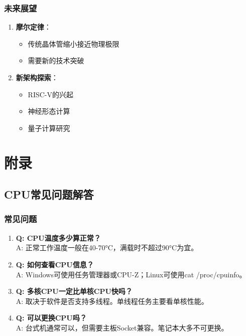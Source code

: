 \documentclass[12pt,UTF8]{ctexbook}
\begin{document}
\section{未来展望}

\begin{enumerate}
    \item \textbf{摩尔定律}：
    \begin{itemize}[leftmargin=2em]
        \item 传统晶体管缩小接近物理极限
        \item 需要新的技术突破
    \end{itemize}
    
    \item \textbf{新架构探索}：
    \begin{itemize}[leftmargin=2em]
        \item RISC-V的兴起
        \item 神经形态计算
        \item 量子计算研究
    \end{itemize}
\end{enumerate}

\part{附录}

\chapter{CPU常见问题解答}

\section{常见问题}

\begin{enumerate}
    \item \textbf{Q: CPU温度多少算正常？}
    \\A: 正常工作温度一般在40-70°C，满载时不超过90°C为宜。
    
    \item \textbf{Q: 如何查看CPU信息？}
    \\A: Windows可使用任务管理器或CPU-Z；Linux可使用cat /proc/cpuinfo。
    
    \item \textbf{Q: 多核CPU一定比单核CPU快吗？}
    \\A: 取决于软件是否支持多线程。单线程任务主要看单核性能。
    
    \item \textbf{Q: 可以更换CPU吗？}
    \\A: 台式机通常可以，但需要主板Socket兼容。笔记本大多不可更换。
\end{enumerate}
\end{document}
